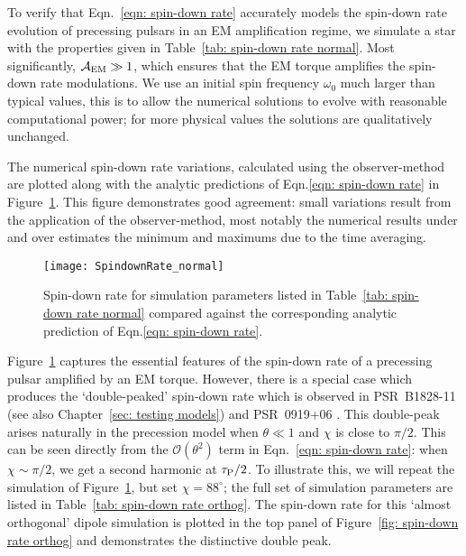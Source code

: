 \documentclass[../full_thesis/full_thesis.tex]{subfiles}
\newcommand{\thisdir}{../inertial_frame}
\begin{document}
To verify that Eqn.~\eqref{eqn: spin-down rate} accurately models the spin-down
rate evolution of precessing pulsars in an EM amplification regime, we simulate
a star with the properties given in Table~\ref{tab: spin-down rate normal}.
Most significantly, $\mathcal{A}_{\mathrm{EM}} \gg 1$, which ensures that the EM torque amplifies
the spin-down rate modulations. We use an initial spin frequency $\omega_0$
much larger than typical values, this is to allow the numerical solutions to
evolve with reasonable computational power; for more physical values the
solutions are qualitatively unchanged.
\begin{table}[htb]
\centering

\caption{Simulation parameters for the spin-down rate plotted in
Figure~\ref{fig: spin-down rate normal}.}
\label{tab: spin-down rate normal}
\end{table}

The numerical spin-down rate variations, calculated using the observer-method
are plotted along with the analytic predictions of Eqn.\eqref{eqn: spin-down rate}
in Figure~\ref{fig: spin-down rate normal}.
This figure demonstrates good agreement: small variations result from the
application of the observer-method, most notably the numerical results under
and over estimates the minimum and maximums due to the time averaging.
\begin{figure}[htb]
\centering
\texttt{[image: SpindownRate\_normal]}
\caption{Spin-down rate for simulation parameters listed in Table~\ref{tab:
spin-down rate normal} compared against the corresponding analytic prediction
of Eqn.\eqref{eqn: spin-down rate}.}
\label{fig: spin-down rate normal}
\end{figure}

Figure~\ref{fig: spin-down rate normal} captures the essential features of the
spin-down rate of a precessing pulsar amplified by an EM torque. However, there
is a special case which produces the `double-peaked' spin-down rate which is
observed in PSR~B1828-11 \citep{Lyne2010} (see also Chapter~\ref{sec: testing
models}) and PSR~0919+06 \citep{Perera2015}.  This double-peak arises naturally
in the precession model when $\theta \ll 1$ and $\chi$ is close to $\pi/2$.
This can be seen directly from the $\mathcal{O}(\theta^{2})$ term in
Eqn.~\eqref{eqn: spin-down rate}: when $\chi \sim \pi/2$, we get a second
harmonic at $\tau_{\mathrm{P}}/2$. To illustrate this, we will repeat the simulation of
Figure~\ref{fig: spin-down rate normal}, but set $\chi=88^{\circ}$; the full
set of simulation parameters are listed in Table~\ref{tab: spin-down rate
orthog}.
The spin-down rate for this `almost orthogonal' dipole simulation is plotted
in the top panel of Figure~\ref{fig: spin-down rate orthog} and demonstrates the
distinctive double peak.
\end{document}
